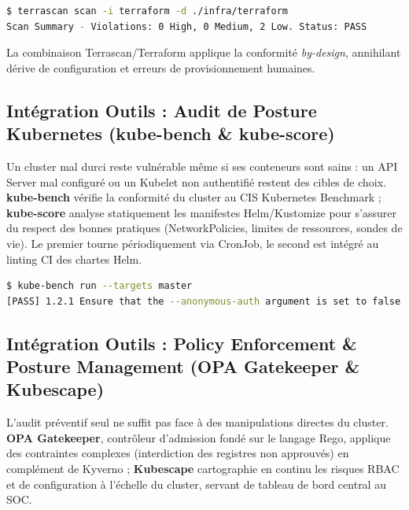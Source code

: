 \begin{lstlisting}[language=bash, caption={Rapport de scan Terrascan}, label={lst:terrascan_proof}]
$ terrascan scan -i terraform -d ./infra/terraform
Scan Summary - Violations: 0 High, 0 Medium, 2 Low. Status: PASS
\end{lstlisting}

La combinaison Terrascan/Terraform applique la conformité \textit{by-design}, annihilant dérive de configuration et erreurs de provisionnement humaines.

\subsection{Intégration Outils : Audit de Posture Kubernetes (kube-bench \& kube-score)}

Un cluster mal durci reste vulnérable même si ses conteneurs sont sains : un API Server mal configuré ou un Kubelet non authentifié restent des cibles de choix. \textbf{kube-bench} vérifie la conformité du cluster au CIS Kubernetes Benchmark ; \textbf{kube-score} analyse statiquement les manifestes Helm/Kustomize pour s'assurer du respect des bonnes pratiques (NetworkPolicies, limites de ressources, sondes de vie). Le premier tourne périodiquement via CronJob, le second est intégré au linting CI des chartes Helm.

\begin{lstlisting}[language=bash, caption={Exécution de kube-bench sur un nœud master}, label={lst:kube_bench_proof}]
$ kube-bench run --targets master
[PASS] 1.2.1 Ensure that the --anonymous-auth argument is set to false
\end{lstlisting}

\subsection{Intégration Outils : Policy Enforcement \& Posture Management (OPA Gatekeeper \& Kubescape)}

L'audit préventif seul ne suffit pas face à des manipulations directes du cluster. \textbf{OPA Gatekeeper}, contrôleur d'admission fondé sur le langage Rego, applique des contraintes complexes (interdiction des registres non approuvés) en complément de Kyverno ; \textbf{Kubescape} cartographie en continu les risques RBAC et de configuration à l'échelle du cluster, servant de tableau de bord central au SOC.

